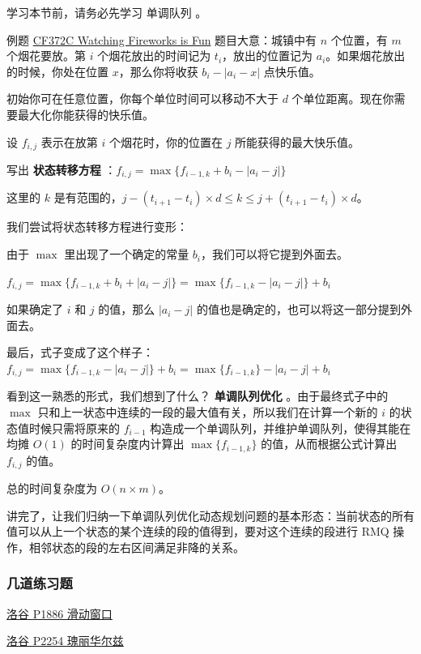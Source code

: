学习本节前，请务必先学习  单调队列 。

\begin{NOTE}{例题 \href{http://codeforces.com/problemset/problem/372/C}{CF372C Watching Fireworks is Fun}}{}
题目大意：城镇中有 $n$ 个位置，有 $m$ 个烟花要放。第 $i$ 个烟花放出的时间记为 $t_i$，放出的位置记为 $a_i$。如果烟花放出的时候，你处在位置 $x$，那么你将收获 $b_i-|a_i-x|$ 点快乐值。
\end{NOTE}


初始你可在任意位置，你每个单位时间可以移动不大于 $d$ 个单位距离。现在你需要最大化你能获得的快乐值。

设 $f_{i,j}$ 表示在放第 $i$ 个烟花时，你的位置在 $j$ 所能获得的最大快乐值。

写出 \textbf{ 状态转移方程 } ：$f_{i,j}=\max\{f_{i-1,k}+b_i-|a_i-j|\}$

这里的 $k$ 是有范围的，$j-(t_{i+1}-t_i)\times d\le k\le j+(t_{i+1}-t_i)\times d$。

我们尝试将状态转移方程进行变形：

由于 $\max$ 里出现了一个确定的常量 $b_i$，我们可以将它提到外面去。

$f_{i,j}=\max\{f_{i-1,k}+b_i+|a_i-j|\}=\max\{f_{i-1,k}-|a_i-j|\}+b_i$

如果确定了 $i$ 和 $j$ 的值，那么 $|a_i-j|$ 的值也是确定的，也可以将这一部分提到外面去。

最后，式子变成了这个样子：$f_{i,j}=\max\{f_{i-1,k}-|a_i-j|\}+b_i=\max\{f_{i-1,k}\}-|a_i-j|+b_i$

看到这一熟悉的形式，我们想到了什么？\textbf{ 单调队列优化 }。由于最终式子中的 $\max$ 只和上一状态中连续的一段的最大值有关，所以我们在计算一个新的 $i$ 的状态值时候只需将原来的 $f_{i-1}$ 构造成一个单调队列，并维护单调队列，使得其能在均摊 $O(1)$ 的时间复杂度内计算出 $\max\{f_{i-1,k}\}$ 的值，从而根据公式计算出 $f_{i,j}$ 的值。

总的时间复杂度为 $O(n\times m)$。

讲完了，让我们归纳一下单调队列优化动态规划问题的基本形态：当前状态的所有值可以从上一个状态的某个连续的段的值得到，要对这个连续的段进行 RMQ 操作，相邻状态的段的左右区间满足非降的关系。

\subsubsection{几道练习题}

\href{https://www.luogu.org/problemnew/show/P1886}{洛谷 P1886 滑动窗口}

\href{https://www.luogu.org/problemnew/show/P2254}{洛谷 P2254 瑰丽华尔兹}


